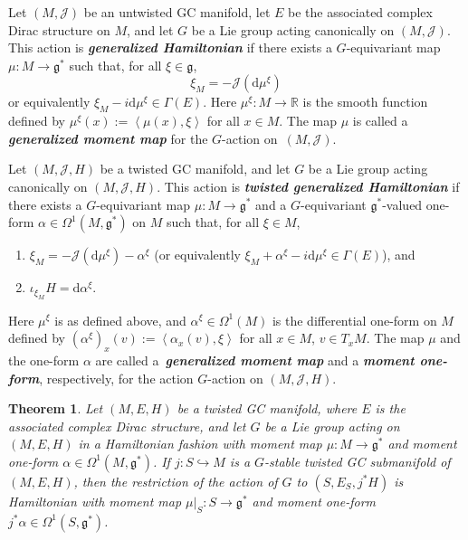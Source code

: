 \documentclass{article}
\newtheorem{Theorem}{Theorem}[section]
\numberwithin{equation}{section}
\newcommand{\deff}[1]{\textbf{\emph{#1}}}
\newcommand{\func}[3]{#1 \colon #2 \to #3}
\newcommand{\hookfunc}[3]{#1 \colon #2 \hookrightarrow #3}
\newcommand{\tang}{T}
\newcommand{\iprod}[2]{\left\langle {#1} , {#2} \right\rangle}
\begin{document}
\begin{Definition}
\label{genhamactiondef}

Let $(M,\mathcal{J})$ be an untwisted GC manifold, let $E$ be the associated complex Dirac structure on $M$, and let $G$ be a Lie group acting canonically on $(M,\mathcal{J})$.  This action is \deff{generalized Hamiltonian} if there exists a $G$-equivariant map $\func{\mu}{M}{\mathfrak{g}^{\ast}}$ such that, for all $\xi \in \mathfrak{g}$,
\[
  \xi_M = - \mathcal{J} ( \mathrm{d} \mu^{\xi} )
\]
or equivalently $\xi_M - i \mathrm{d} \mu^{\xi} \in \Gamma(E)$.
Here $\func{\mu^{\xi}}{M}{\mathbb{R}}$ is the smooth function def\/ined by $\mu^{\xi}(x) := \iprod{\mu(x)}{\xi}$ for all $x \in M$.  The map $\mu$ is called a \deff{generalized moment map} for the $G$-action on~$(M, \mathcal{J})$.



Let $(M,\mathcal{J},H)$ be a twisted GC manifold, and let $G$ be a Lie group acting canonically on $(M,\mathcal{J},H)$.  This action is \deff{twisted generalized Hamiltonian} if there exists a $G$-equivariant map $\func{\mu}{M}{\mathfrak{g}^{\ast}}$ and a $G$-equivariant $\mathfrak{g}^*$-valued one-form $\alpha \in \Omega^1(M, \mathfrak{g}^{\ast})$ on $M$ such that, for all $\xi \in M$,
\begin{enumerate}\itemsep=0pt
  \item $\xi_M = - \mathcal{J} ( \mathrm{d} \mu^{\xi} ) - \alpha^{\xi}$ (or equivalently $\xi_M + \alpha^{\xi} - i \mathrm{d} \mu^{\xi} \in \Gamma(E)$), and
  \item $\iota_{\xi_M} H = \mathrm{d} \alpha^{\xi}$.
\end{enumerate}
Here $\mu^{\xi}$ is as def\/ined above, and $\alpha^{\xi} \in \Omega^1(M)$ is the dif\/ferential one-form on $M$ def\/ined by $(\alpha^{\xi})_x (v) := \iprod{\alpha_x(v)}{\xi}$ for all $x \in M$, $v \in \tang_x M$.  The map $\mu$ and the one-form $\alpha$ are called a~\deff{generalized moment map} and a \deff{moment one-form}, respectively, for the action $G$-action on $(M, \mathcal{J}, H)$.
\end{Definition}

\begin{Theorem} \label{thm6}
Let $(M,E,H)$ be a twisted GC manifold, where $E$ is the associated complex Dirac structure, and let $G$ be a Lie group acting on $(M,E,H)$ in a Hamiltonian fashion with moment map $\func{\mu}{M}{\mathfrak{g}^*}$ and moment one-form $\alpha \in \Omega^1(M,\mathfrak{g}^*)$.
If $\hookfunc{j}{S}{M}$ is a $G$-stable twisted GC submanifold of $(M,E,H)$, then the restriction of the action of $G$ to $(S,E_S,j^* H)$ is Hamiltonian with moment map $\func{\mu|_S}{S}{\mathfrak{g}^*}$ and moment one-form $j^* \alpha \in \Omega^1(S,\mathfrak{g}^*)$.
\end{Theorem}
\end{document}
